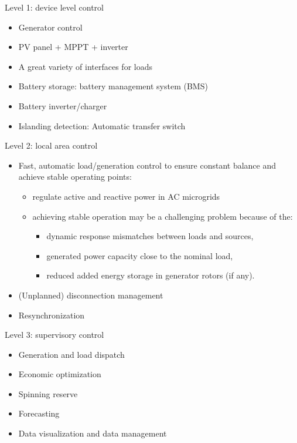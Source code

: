 \begin{frame}{Level 1: device level control}
\begin{itemize}
\item Generator control
\item PV panel + MPPT + inverter
\item A great variety of interfaces for loads
\item Battery storage: battery management system (BMS)
\item Battery inverter/charger
\item Islanding detection: Automatic transfer switch
\end{itemize}
\end{frame}

\begin{frame}{Level 2: local area control}
\begin{itemize}
\item Fast, automatic load/generation control to ensure constant balance and
  achieve stable operating points:
  \begin{itemize}
  \item regulate active and reactive power in AC microgrids
  \item achieving stable operation may be a challenging problem because of the:
    \begin{itemize}
    \item dynamic response mismatches between loads and sources,
    \item generated power capacity close to the nominal load,
    \item reduced added energy storage in generator rotors (if any).
    \end{itemize}
  \end{itemize}
\item (Unplanned) disconnection management
\item Resynchronization
\end{itemize}
\end{frame}

\begin{frame}{Level 3: supervisory control}
\begin{itemize}
\item Generation and load dispatch
\item Economic optimization
\item Spinning reserve
\item Forecasting
\item Data visualization and data management
\end{itemize}
\end{frame}


